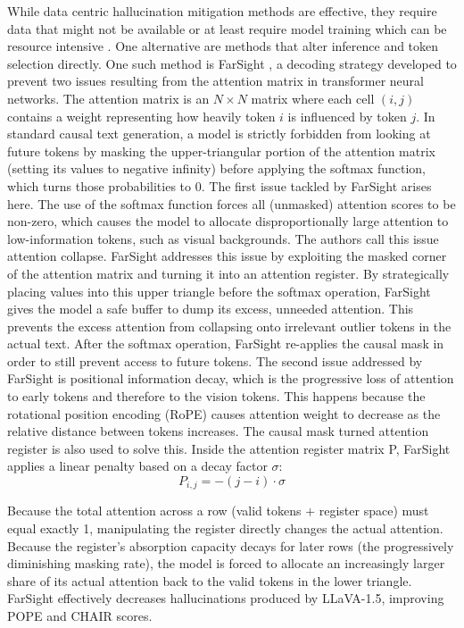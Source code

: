 While data centric hallucination mitigation methods are effective, they require data that might not be available or at least require model training which can be resource intensive \autocite{tangSeeingFarClearly2025a}. One alternative are methods that alter inference and token selection directly. One such method is FarSight \autocite{tangSeeingFarClearly2025a}
, a decoding strategy developed to prevent two issues resulting from the attention matrix in transformer neural networks. The attention matrix is an $N \times N$ matrix where each cell $(i,j)$ contains a weight representing how heavily token $i$ is influenced by token $j$. In standard causal text generation, a model is strictly forbidden from looking at future tokens by masking the upper-triangular portion of the attention matrix (setting its values to negative infinity) before applying the softmax function, which turns those probabilities to 0. The first issue tackled by FarSight arises here. The use of the softmax function forces all (unmasked) attention scores to be non-zero, which causes the model to allocate disproportionally large attention to low-information tokens, such as visual backgrounds. The authors call this issue attention collapse. FarSight addresses this issue by exploiting the masked corner of the attention matrix and turning it into an attention register. By strategically placing values into this upper triangle before the softmax operation, FarSight gives the model a safe buffer to dump its excess, unneeded attention. This prevents the excess attention from collapsing onto irrelevant outlier tokens in the actual text. After the softmax operation, FarSight re-applies the causal mask in order to still prevent access to future tokens. The second issue addressed by FarSight is positional information decay, which is the progressive loss of attention to early tokens and therefore to the vision tokens. This happens because the rotational position encoding (RoPE) causes attention weight to decrease as the relative distance between tokens increases. The causal mask turned attention register is also used to solve this. Inside the attention register matrix P, FarSight applies a linear penalty based on a decay factor $\sigma$: $$P_{i, j} = -(j-i) \cdot \sigma $$


Because the total attention across a row (valid tokens + register space) must equal exactly 1, manipulating the register directly changes the actual attention. Because the register's absorption capacity decays for later rows (the progressively diminishing masking rate), the model is forced to allocate an increasingly larger share of its actual attention back to the valid tokens in the lower triangle. FarSight effectively decreases hallucinations produced by LLaVA-1.5, improving POPE and CHAIR scores.

